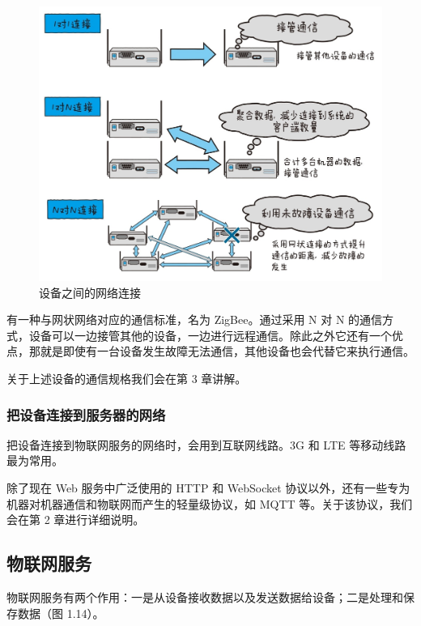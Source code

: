 \documentclass[12pt,UTF8]{ctexbook}
\begin{document}
\begin{figure}[htbp]
	\centering
	\includegraphics[width=1\linewidth]{13}
	\caption{设备之间的网络连接}
	\label{fig:1}
\end{figure}

有一种与网状网络对应的通信标准，名为 ZigBee。通过采用 N 对 N 的通信方式，设备可以一边接管其他的设备，一边进行远程通信。除此之外它还有一个优点，那就是即使有一台设备发生故障无法通信，其他设备也会代替它来执行通信。

关于上述设备的通信规格我们会在第 3 章讲解。

\subsubsection{把设备连接到服务器的网络}

把设备连接到物联网服务的网络时，会用到互联网线路。3G 和 LTE 等移动线路最为常用。

除了现在 Web 服务中广泛使用的 HTTP 和 WebSocket 协议以外，还有一些专为机器对机器通信和物联网而产生的轻量级协议，如 MQTT 等。关于该协议，我们会在第 2 章进行详细说明。

\subsection{物联网服务}

物联网服务有两个作用：一是从设备接收数据以及发送数据给设备；二是处理和保存数据（图 1.14）。
\end{document}
